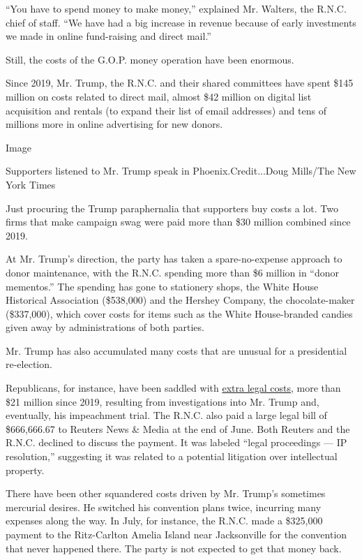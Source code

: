 ``You have to spend money to make money,'' explained Mr. Walters, the
R.N.C. chief of staff. ``We have had a big increase in revenue because
of early investments we made in online fund-raising and direct mail.''

Still, the costs of the G.O.P. money operation have been enormous.

Since 2019, Mr. Trump, the R.N.C. and their shared committees have spent
\$145 million on costs related to direct mail, almost \$42 million on
digital list acquisition and rentals (to expand their list of email
addresses) and tens of millions more in online advertising for new
donors.

Image

Supporters listened to Mr. Trump speak in Phoenix.Credit...Doug
Mills/The New York Times

Just procuring the Trump paraphernalia that supporters buy costs a lot.
Two firms that make campaign swag were paid more than \$30 million
combined since 2019.

At Mr. Trump's direction, the party has taken a spare-no-expense
approach to donor maintenance, with the R.N.C. spending more than \$6
million in ``donor mementos.'' The spending has gone to stationery
shops, the White House Historical Association (\$538,000) and the
Hershey Company, the chocolate-maker (\$337,000), which cover costs for
items such as the White House-branded candies given away by
administrations of both parties.

Mr. Trump has also accumulated many costs that are unusual for a
presidential re-election.

Republicans, for instance, have been saddled with
\href{https://www.nytimes3xbfgragh.onion/2020/09/05/us/politics/trump-campaign-funds-legal-bills.html}{extra
legal costs}, more than \$21 million since 2019, resulting from
investigations into Mr. Trump and, eventually, his impeachment trial.
The R.N.C. also paid a large legal bill of \$666,666.67 to Reuters News
\& Media at the end of June. Both Reuters and the R.N.C. declined to
discuss the payment. It was labeled ``legal proceedings --- IP
resolution,'' suggesting it was related to a potential litigation over
intellectual property.

There have been other squandered costs driven by Mr. Trump's sometimes
mercurial desires. He switched his convention plans twice, incurring
many expenses along the way. In July, for instance, the R.N.C. made a
\$325,000 payment to the Ritz-Carlton Amelia Island near Jacksonville
for the convention that never happened there. The party is not expected
to get that money back.

